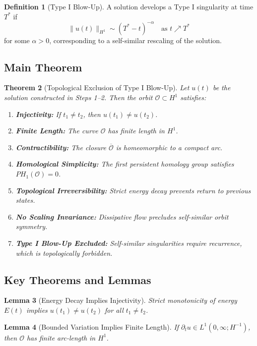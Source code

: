 \documentclass[11pt]{article}
\newtheorem{theorem}{Theorem}[section]
\newtheorem{lemma}[theorem]{Lemma}
\theoremstyle{definition}
\newtheorem{definition}[theorem]{Definition}
\begin{document}
\begin{definition}[Type I Blow-Up]
A solution develops a Type I singularity at time \( T^* \) if
\[ \|u(t)\|_{H^1} \sim (T^* - t)^{-\alpha} \quad \text{as } t \nearrow T^* \]
for some \( \alpha > 0 \), corresponding to a self-similar rescaling of the solution.
\end{definition}

\subsection*{Main Theorem}
\begin{theorem}[Topological Exclusion of Type I Blow-Up]
Let \( u(t) \) be the solution constructed in Steps 1--2. Then the orbit \( \mathcal{O} \subset H^1 \) satisfies:
\begin{enumerate}
  \item \textbf{Injectivity:} If \( t_1 \ne t_2 \), then \( u(t_1) \ne u(t_2) \).
  \item \textbf{Finite Length:} The curve \( \mathcal{O} \) has finite length in \( H^1 \).
  \item \textbf{Contractibility:} The closure \( \overline{\mathcal{O}} \) is homeomorphic to a compact arc.
  \item \textbf{Homological Simplicity:} The first persistent homology group satisfies \( PH_1(\mathcal{O}) = 0 \).
  \item \textbf{Topological Irreversibility:} Strict energy decay prevents return to previous states.
  \item \textbf{No Scaling Invariance:} Dissipative flow precludes self-similar orbit symmetry.
  \item \textbf{Type I Blow-Up Excluded:} Self-similar singularities require recurrence, which is topologically forbidden.
\end{enumerate}
\end{theorem}

\subsection*{Key Theorems and Lemmas}
\begin{lemma}[Energy Decay Implies Injectivity]
Strict monotonicity of energy \( E(t) \) implies \( u(t_1) \ne u(t_2) \) for all \( t_1 \ne t_2 \).
\end{lemma}

\begin{lemma}[Bounded Variation Implies Finite Length]
If \( \partial_t u \in L^1(0,\infty; H^{-1}) \), then \( \mathcal{O} \) has finite arc-length in \( H^1 \).
\end{lemma}
\end{document}
